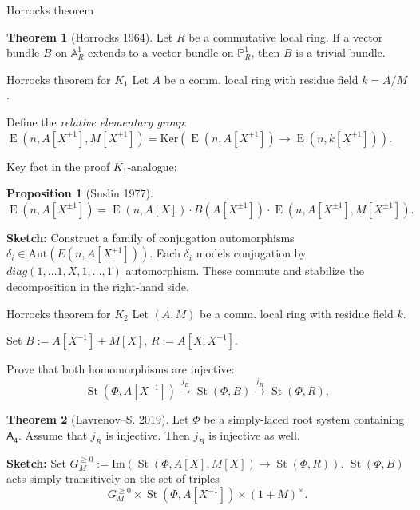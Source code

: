 \documentclass[handout]{beamer} %
\DeclareMathOperator{\E}{E}
\DeclareMathOperator{\St}{St}
\theoremstyle{definition}
\newtheorem*{thm}{Theorem}
\newtheorem*{prop}{Proposition}
\begin{document}
\begin{frame}{Horrocks theorem}
\begin{thm}[Horrocks 1964]  Let $R$ be a commutative local ring. If a vector bundle $B$ on $\mathbb{A}^1_R$ extends to a vector bundle on $\mathbb{P}^1_R$, then $B$ is a trivial bundle. \end{thm}
\end{frame}

\begin{frame}{Horrocks theorem for $K_1$}
Let $A$ be a comm. local ring with residue field $k = A/M$.
\pause

 Define the \textit{relative elementary group}:
 $\E(n, A[X^{\pm 1}], M[X^{\pm 1}]) = \mathrm{Ker}(\E(n, A[X^{\pm 1}]) \to \E(n, k[X^{\pm 1}])).$
\pause

 Key fact in the proof $K_1$-analogue:
\begin{prop}[Suslin 1977]
 \( \E(n, A[X^{\pm 1}]) = \E(n, A[X]) \cdot B(A[X^{\pm 1}]) \cdot \E(n, A[X^{\pm 1}], M[X^{\pm 1}]). \)
\end{prop}
\pause

 \textbf{Sketch:} Construct a family of conjugation automorphisms $\delta_i \in \mathrm{Aut}(E(n, A[X^{\pm 1}]))$.
\pause
 Each $\delta_i$ models conjugation by $diag(1, \ldots 1, X, 1, \ldots, 1)$ automorphism.
\pause
 These commute and stabilize the decomposition in the right-hand side.

\end{frame}

\begin{frame}{Horrocks theorem for $K_2$}
 Let $(A, M)$ be a comm. local ring with residue field $k$.
\pause

 Set $B := A[X^{-1}] + M[X]$, $R := A[X, X^{-1}].$
\pause

 Prove that both homomorphisms are injective:
 \[ \St(\Phi, A[X^{-1}]) \xrightarrow{j_B} \St(\Phi, B) \xrightarrow{j_R} \St(\Phi, R), \]
\pause

 \begin{thm}[Lavrenov--S. 2019] Let $\Phi$ be a simply-laced root system containing $\mathsf{A_4}$.
 Assume that $j_R$ is injective. Then $j_B$ is injective as well.
 \end{thm}
\pause

  \textbf{Sketch:} Set $G^{\geq 0}_M := \mathrm{Im}\left(\St(\Phi, A[X], M[X]) \to \St(\Phi, R)\right). $
\pause
  $\St(\Phi, B)$ acts simply transitively on the set of triples
  \[G^{\geq 0}_M \times \St(\Phi, A[X^{-1}]) \times (1 + M)^\times.\]
\end{frame}
\end{document}
